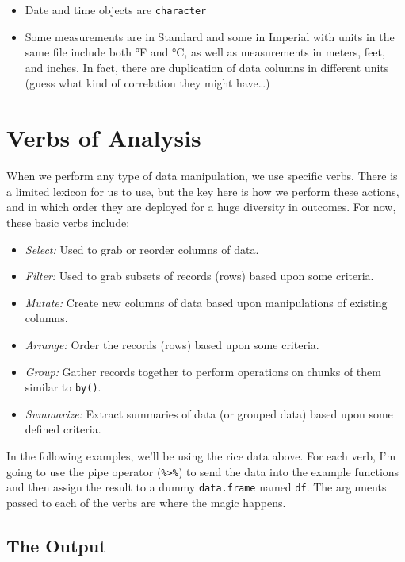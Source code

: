 \documentclass[
  letterpaper,
]{book}
\providecommand{\tightlist}{%
  \setlength{\itemsep}{0pt}\setlength{\parskip}{0pt}}
\begin{document}
\begin{itemize}
\tightlist
\item
  Date and time objects are \texttt{character}
\item
  Some measurements are in Standard and some in Imperial with units in
  the same file include both °F and °C, as well as measurements in
  meters, feet, and inches. In fact, there are duplication of data
  columns in different units (guess what kind of correlation they might
  have\ldots)
\end{itemize}

\section{Verbs of Analysis}\label{verbs-of-analysis}

When we perform any type of data manipulation, we use specific verbs.
There is a limited lexicon for us to use, but the key here is how we
perform these actions, and in which order they are deployed for a huge
diversity in outcomes. For now, these basic verbs include:

\begin{itemize}
\tightlist
\item
  \emph{Select:} Used to grab or reorder columns of data.
\item
  \emph{Filter:} Used to grab subsets of records (rows) based upon some
  criteria.
\item
  \emph{Mutate:} Create new columns of data based upon manipulations of
  existing columns.
\item
  \emph{Arrange:} Order the records (rows) based upon some criteria.
\item
  \emph{Group:} Gather records together to perform operations on chunks
  of them similar to \texttt{by()}.
\item
  \emph{Summarize:} Extract summaries of data (or grouped data) based
  upon some defined criteria.
\end{itemize}

In the following examples, we'll be using the rice data above. For each
verb, I'm going to use the pipe operator (\texttt{\%\textgreater{}\%})
to send the data into the example functions and then assign the result
to a dummy \texttt{data.frame} named \texttt{df}. The arguments passed
to each of the verbs are where the magic happens.

\subsection{The Output}\label{the-output}
\end{document}
